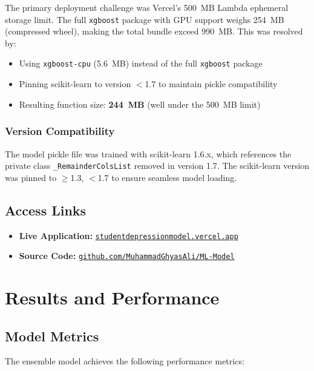 \documentclass[11pt,a4paper]{article}
\begin{document}
The primary deployment challenge was Vercel's 500~MB Lambda ephemeral storage limit. The full \texttt{xgboost} package with GPU support weighs 254~MB (compressed wheel), making the total bundle exceed 990~MB. This was resolved by:
\begin{itemize}[leftmargin=*,nosep]
    \item Using \texttt{xgboost-cpu} (5.6~MB) instead of the full \texttt{xgboost} package
    \item Pinning scikit-learn to version $<$1.7 to maintain pickle compatibility
    \item Resulting function size: \textbf{244~MB} (well under the 500~MB limit)
\end{itemize}

\subsubsection{Version Compatibility}

The model pickle file was trained with scikit-learn 1.6.x, which references the private class \texttt{\_Remainder\-Cols\-List} removed in version 1.7. The scikit-learn version was pinned to $\ge$1.3, $<$1.7 to ensure seamless model loading.

\subsection{Access Links}

\begin{itemize}[leftmargin=*,nosep]
    \item \textbf{Live Application:} \href{https://studentdepressionmodel.vercel.app}{\texttt{studentdepressionmodel.vercel.app}}
    \item \textbf{Source Code:} \href{https://github.com/MuhammadGhyasAli/ML-Model}{\texttt{github.com/MuhammadGhyasAli/ML-Model}}
\end{itemize}

\section{Results and Performance}
\label{sec:results}

\subsection{Model Metrics}

The ensemble model achieves the following performance metrics:
\end{document}
